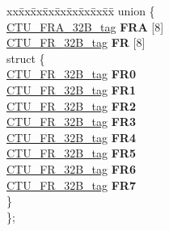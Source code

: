 \begin{DoxyCompactItemize}
\begin{tabbing}
\end{tabbing}\item 
\mbox{\label{structCTU__struct__tag_a2942451816779d4733c4820809d64ae9}} 
\begin{tabbing}
xx\=xx\=xx\=xx\=xx\=xx\=xx\=xx\=xx\=\kill
union \{\\
\>\mbox{\hyperlink{unionCTU__FRA__32B__tag}{CTU\_FRA\_32B\_tag}} {\bfseries FRA} \mbox{[}8\mbox{]}\\
\>\mbox{\hyperlink{unionCTU__FR__32B__tag}{CTU\_FR\_32B\_tag}} {\bfseries FR} \mbox{[}8\mbox{]}\\
\mbox{\label{unionCTU__struct__tag_1_1_0D1898_a1fccc98bea142c6372aadd641105cb31}} 
\>struct \{\\
\>\>\mbox{\hyperlink{unionCTU__FR__32B__tag}{CTU\_FR\_32B\_tag}} {\bfseries FR0}\\
\>\>\mbox{\hyperlink{unionCTU__FR__32B__tag}{CTU\_FR\_32B\_tag}} {\bfseries FR1}\\
\>\>\mbox{\hyperlink{unionCTU__FR__32B__tag}{CTU\_FR\_32B\_tag}} {\bfseries FR2}\\
\>\>\mbox{\hyperlink{unionCTU__FR__32B__tag}{CTU\_FR\_32B\_tag}} {\bfseries FR3}\\
\>\>\mbox{\hyperlink{unionCTU__FR__32B__tag}{CTU\_FR\_32B\_tag}} {\bfseries FR4}\\
\>\>\mbox{\hyperlink{unionCTU__FR__32B__tag}{CTU\_FR\_32B\_tag}} {\bfseries FR5}\\
\>\>\mbox{\hyperlink{unionCTU__FR__32B__tag}{CTU\_FR\_32B\_tag}} {\bfseries FR6}\\
\>\>\mbox{\hyperlink{unionCTU__FR__32B__tag}{CTU\_FR\_32B\_tag}} {\bfseries FR7}\\
\>\} \\
\}; \\


\end{tabbing}
\end{DoxyCompactItemize}
